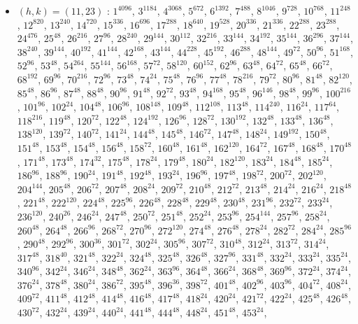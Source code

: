 \begin{itemize}
\item $(h,k)=(11,23)$ : $1^{4096}$, $3^{1184}$, $4^{3068}$, $5^{672}$, $6^{1392}$, $7^{488}$, $8^{1046}$, $9^{728}$, $10^{768}$, $11^{248}$, $12^{820}$, $13^{240}$, $14^{720}$, $15^{336}$, $16^{696}$, $17^{288}$, $18^{640}$, $19^{528}$, $20^{336}$, $21^{336}$, $22^{288}$, $23^{288}$, $24^{476}$, $25^{48}$, $26^{216}$, $27^{96}$, $28^{240}$, $29^{144}$, $30^{112}$, $32^{216}$, $33^{144}$, $34^{192}$, $35^{144}$, $36^{296}$, $37^{144}$, $38^{240}$, $39^{144}$, $40^{192}$, $41^{144}$, $42^{168}$, $43^{144}$, $44^{228}$, $45^{192}$, $46^{288}$, $48^{144}$, $49^{72}$, $50^{96}$, $51^{168}$, $52^{96}$, $53^{48}$, $54^{264}$, $55^{144}$, $56^{168}$, $57^{72}$, $58^{120}$, $60^{152}$, $62^{96}$, $63^{48}$, $64^{72}$, $65^{48}$, $66^{72}$, $68^{192}$, $69^{96}$, $70^{216}$, $72^{96}$, $73^{48}$, $74^{24}$, $75^{48}$, $76^{96}$, $77^{48}$, $78^{216}$, $79^{72}$, $80^{96}$, $81^{48}$, $82^{120}$, $85^{48}$, $86^{96}$, $87^{48}$, $88^{48}$, $90^{96}$, $91^{48}$, $92^{72}$, $93^{48}$, $94^{168}$, $95^{48}$, $96^{146}$, $98^{48}$, $99^{96}$, $100^{216}$, $101^{96}$, $102^{24}$, $104^{48}$, $106^{96}$, $108^{148}$, $109^{48}$, $112^{108}$, $113^{48}$, $114^{240}$, $116^{24}$, $117^{64}$, $118^{216}$, $119^{48}$, $120^{72}$, $122^{48}$, $124^{192}$, $126^{96}$, $128^{72}$, $130^{192}$, $132^{48}$, $133^{48}$, $136^{48}$, $138^{120}$, $139^{72}$, $140^{72}$, $141^{24}$, $144^{48}$, $145^{48}$, $146^{72}$, $147^{48}$, $148^{24}$, $149^{192}$, $150^{48}$, $151^{48}$, $153^{48}$, $154^{48}$, $156^{48}$, $158^{72}$, $160^{48}$, $161^{48}$, $162^{120}$, $164^{72}$, $167^{48}$, $168^{48}$, $170^{48}$, $171^{48}$, $173^{48}$, $174^{32}$, $175^{48}$, $178^{24}$, $179^{48}$, $180^{24}$, $182^{120}$, $183^{24}$, $184^{48}$, $185^{24}$, $186^{96}$, $188^{96}$, $190^{24}$, $191^{48}$, $192^{48}$, $193^{24}$, $196^{96}$, $197^{48}$, $198^{72}$, $200^{72}$, $202^{120}$, $204^{144}$, $205^{48}$, $206^{72}$, $207^{48}$, $208^{24}$, $209^{72}$, $210^{48}$, $212^{72}$, $213^{48}$, $214^{24}$, $216^{24}$, $218^{48}$, $221^{48}$, $222^{120}$, $224^{48}$, $225^{96}$, $226^{48}$, $228^{48}$, $229^{48}$, $230^{48}$, $231^{96}$, $232^{72}$, $233^{24}$, $236^{120}$, $240^{26}$, $246^{24}$, $247^{48}$, $250^{72}$, $251^{48}$, $252^{24}$, $253^{96}$, $254^{144}$, $257^{96}$, $258^{24}$, $260^{48}$, $264^{48}$, $266^{96}$, $268^{72}$, $270^{96}$, $272^{120}$, $274^{48}$, $276^{48}$, $278^{24}$, $282^{72}$, $284^{24}$, $285^{96}$, $290^{48}$, $292^{96}$, $300^{36}$, $301^{72}$, $302^{24}$, $305^{96}$, $307^{72}$, $310^{48}$, $312^{24}$, $313^{72}$, $314^{24}$, $317^{48}$, $318^{40}$, $321^{48}$, $322^{24}$, $324^{48}$, $325^{48}$, $326^{48}$, $327^{96}$, $331^{48}$, $332^{24}$, $333^{24}$, $335^{24}$, $340^{96}$, $342^{24}$, $346^{24}$, $348^{48}$, $362^{24}$, $363^{96}$, $364^{48}$, $366^{24}$, $368^{48}$, $369^{96}$, $372^{24}$, $374^{24}$, $376^{24}$, $378^{48}$, $380^{24}$, $386^{72}$, $395^{48}$, $396^{36}$, $398^{72}$, $401^{48}$, $402^{96}$, $403^{96}$, $404^{72}$, $408^{24}$, $409^{72}$, $411^{48}$, $412^{48}$, $414^{48}$, $416^{48}$, $417^{48}$, $418^{24}$, $420^{24}$, $421^{72}$, $422^{24}$, $425^{48}$, $426^{48}$, $430^{72}$, $432^{24}$, $439^{24}$, $440^{24}$, $441^{48}$, $444^{48}$, $448^{24}$, $451^{48}$, $453^{24}$, 
\end{itemize}
